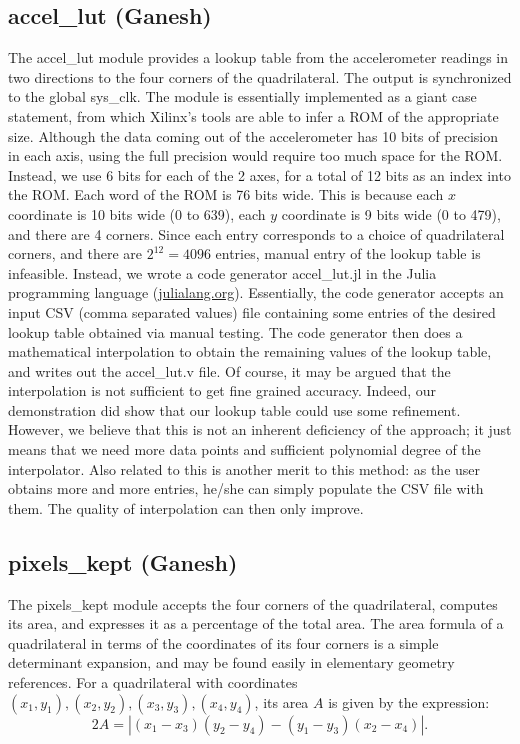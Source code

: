 \documentclass{article}
\begin{document}
\subsection{accel\_lut (Ganesh)}
The accel\_lut module provides a lookup table from the accelerometer readings in two directions to the four corners of the quadrilateral.
The output is synchronized to the global sys\_clk.
The module is essentially implemented as a giant case statement, from which Xilinx's tools are able to infer a ROM of the appropriate size.
Although the data coming out of the accelerometer has 10 bits of precision in each axis,
using the full precision would require too much space for the ROM.
Instead, we use 6 bits for each of the 2 axes, for a total of 12 bits as an index into the ROM.
Each word of the ROM is 76 bits wide.
This is because each $x$ coordinate is 10 bits wide (0 to 639), each $y$ coordinate is 9 bits wide (0 to 479), and there are 4 corners.
Since each entry corresponds to a choice of quadrilateral corners, and there are $2^{12} = 4096$ entries, manual entry of the lookup table is infeasible.
Instead, we wrote a code generator accel\_lut.jl in the Julia programming language (\url{julialang.org}).
Essentially, the code generator accepts an input CSV (comma separated values) file containing some entries of the desired lookup table obtained via manual testing.
The code generator then does a mathematical interpolation to obtain the remaining values of the lookup table, and writes out the accel\_lut.v file.
Of course, it may be argued that the interpolation is not sufficient to get fine grained accuracy.
Indeed, our demonstration did show that our lookup table could use some refinement.
However, we believe that this is not an inherent deficiency of the approach; it just means that we need more data points and sufficient polynomial degree of the interpolator.
Also related to this is another merit to this method: as the user obtains more and more entries,
he/she can simply populate the CSV file with them.
The quality of interpolation can then only improve.

\subsection{pixels\_kept (Ganesh)}
The pixels\_kept module accepts the four corners of the quadrilateral, computes its area, and expresses it as a percentage of the total area.
The area formula of a quadrilateral in terms of the coordinates of its four corners is a simple determinant expansion,
and may be found easily in elementary geometry references.
For a quadrilateral with coordinates $(x_1, y_1), (x_2, y_2), (x_3, y_3), (x_4, y_4)$, its area $A$ is given by the expression:
\begin{equation}
    2A = | (x_1 - x_3)(y_2 - y_4) - (y_1 - y_3)(x_2 - x_4) |.
\end{equation}
\end{document}
